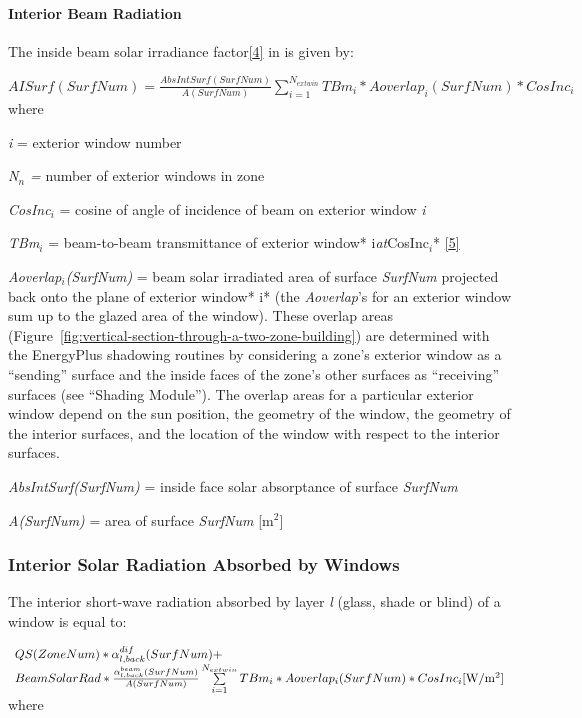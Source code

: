 \paragraph{Interior Beam Radiation}\label{interior-beam-radiation}

The inside beam solar irradiance factor\protect\hyperlink{ux5fftn4}{{[}4{]}} in is given by:

\(AISurf(SurfNum) = \frac{{AbsIntSurf(SurfNum)}}{{A(SurfNum)}}\sum\limits_{i = 1}^{{N_{extwin}}} {TB{m_i}*Aoverla{p_i}(SurfNum)*CosIn{c_i}}\) where

\emph{i} = exterior window number

\emph{N\(_{n}\) =} number of exterior windows in zone

\emph{CosInc\(_{i}\)} = cosine of angle of incidence of beam on exterior window \emph{i}

\emph{TBm\(_{i}\)} = beam-to-beam transmittance of exterior window* i\emph{at}CosInc\(_{i}\)* \protect\hyperlink{ux5fftn5}{{[}5{]}}

\emph{Aoverlap\(_{i}\)(SurfNum)} = beam solar irradiated area of surface \emph{SurfNum} projected back onto the plane of exterior window* i* (the \emph{Aoverlap}'s for an exterior window sum up to the glazed area of the window). These overlap areas (Figure~\ref{fig:vertical-section-through-a-two-zone-building}) are determined with the EnergyPlus shadowing routines by considering a zone's exterior window as a ``sending'' surface and the inside faces of the zone's other surfaces as ``receiving'' surfaces (see ``Shading Module''). The overlap areas for a particular exterior window depend on the sun position, the geometry of the window, the geometry of the interior surfaces, and the location of the window with respect to the interior surfaces.

\emph{AbsIntSurf(SurfNum)} = inside face solar absorptance of surface \emph{SurfNum}

\emph{A(SurfNum)} = area of surface \emph{SurfNum} {[}m\(^{2}\){]}

\subsubsection{Interior Solar Radiation Absorbed by Windows}\label{interior-solar-radiation-absorbed-by-windows}

The interior short-wave radiation absorbed by layer \emph{l} (glass, shade or blind) of a window is equal to:

\(\begin{array}{l}QS(ZoneNum)*\alpha_{l,back}^{dif}(SurfNum) + \\BeamSolarRad*\frac{{\alpha_{l,back}^{beam}(SurfNum)}}{{A(SurfNum)}}\sum\limits_{i = 1}^{{N_{extwin}}} {TB{m_i}*Aoverla{p_i}(SurfNum)} *CosIn{c_i}{\rm{ [W/}}{{\rm{m}}^{\rm{2}}}]\end{array}\) where

